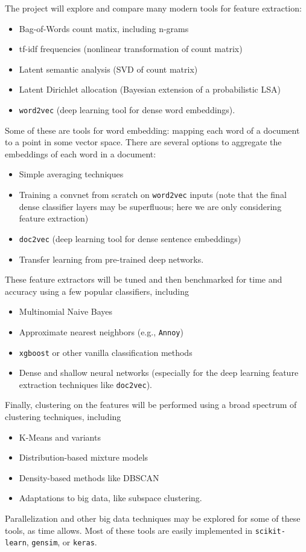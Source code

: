 \documentclass[]{article}
\begin{document}
The project will explore and compare many modern tools for feature extraction:
\begin{itemize}
	\item Bag-of-Words count matix, including n-grams
	\item tf-idf frequencies (nonlinear transformation of count matrix)
	\item Latent semantic analysis (SVD of count matrix)
	\item Latent Dirichlet allocation (Bayesian extension of a probabilistic LSA)
	\item \texttt{word2vec} (deep learning tool for dense word embeddings).
\end{itemize}
Some of these are tools for word embedding: mapping each word of a document to a point in some vector space. There are several options to aggregate the embeddings of each word in a document:
\begin{itemize}
	\item Simple averaging techniques
	\item Training a convnet from scratch on \texttt{word2vec} inputs (note that the final dense classifier layers may be superfluous; here we are only considering feature extraction)
	\item \texttt{doc2vec} (deep learning tool for dense sentence embeddings)
	\item Transfer learning from pre-trained deep networks.
\end{itemize}
These feature extractors will be tuned and then benchmarked for time and accuracy using a few popular classifiers, including
\begin{itemize}
	\item Multinomial Naive Bayes
	\item Approximate nearest neighbors (e.g., \texttt{Annoy}\autocite{Annoy})
	\item \texttt{xgboost} or other vanilla classification methods
	\item Dense and shallow neural networks (especially for the deep learning feature extraction techniques like \texttt{doc2vec}).
\end{itemize}
Finally, clustering on the features will be performed using a broad spectrum of clustering techniques, including
\begin{itemize}
	\item K-Means and variants
	\item Distribution-based mixture models
	\item Density-based methods like DBSCAN
	\item Adaptations to big data, like subspace clustering.
\end{itemize}
Parallelization and other big data techniques may be explored for some of these tools, as time allows. Most of these tools are easily implemented in \texttt{scikit-learn}\autocite{scikit-learn}, \texttt{gensim}\autocite{gensim}, or \texttt{keras}\autocite{keras}.
\end{document}
